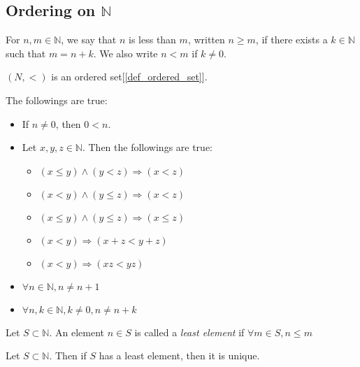 \documentclass{report}
\begin{document}
		\subsection{Ordering on $\mathbb{N}$}
		\begin{defn} \label{def_order_N}
			For $n,m \in \mathbb{N}$, we say that $n$ is less than $m$, written $n \ge m$, if there exists a $k \in \mathbb{N}$ such that $m=n+k$. We also write $n<m$ if $k \ne 0$.
		\end{defn}
		
		\begin{thm}
			$(N,<)$ is an ordered set[\ref{def_ordered_set}].
		\end{thm}
		
		\begin{prop} \label{thm_property_order_N}
			The followings are true:
			\begin{itemize}
				\item If $n \ne 0$, then $0<n$.
				\item Let $x,y,z \in \mathbb{N}$. Then the followings are true:
				\begin{itemize}
					\item $(x \le y) \wedge (y<z) \Rightarrow (x<z)$
					\item $(x<y) \wedge (y \le z) \Rightarrow (x<z)$
					\item $(x \le y) \wedge (y \le z) \Rightarrow (x \le z)$
					\item $(x<y) \Rightarrow (x+z<y+z)$
					\item $(x<y) \Rightarrow (xz<yz)$
				\end{itemize}
				\item $\forall n \in \mathbb{N}, n \ne n+1$
				\item $\forall n,k \in \mathbb{N}, k \ne 0, n \ne n+k$
			\end{itemize}
		\end{prop}
		
		\begin{defn} \label{def_least_element}
			Let $S \subset \mathbb{N}$. An element $n \in S$ is called a \emph{least element} if $\forall m \in S, n \le m$
		\end{defn}
		
		\begin{prop} \label{thm_unique_least_element}
			Let $S \subset \mathbb{N}$. Then if $S$ has a least element, then it is unique.
		\end{prop}
		
\end{document}
